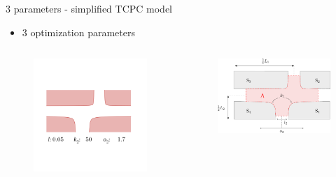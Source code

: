 \documentclass[aspectratio=169,xcolor=dvipsnames]{beamer}
\begin{document}
\begin{frame}{3 parameters - simplified TCPC model}
	\begin{itemize}
		\item 3 optimization parameters
	\end{itemize}
	\begin{columns}
		\begin{column}{.58\textwidth}
			\begin{figure}
				\includegraphics[width=1.\linewidth, trim={5cm 6cm 8cm 19cm}, clip]{Images/d.png}		
			\end{figure}
		\end{column}
		\begin{column}{.42\textwidth}
			\vspace{-15mm}
			\begin{figure}
				\includegraphics[width=1.\linewidth, trim={0 0 0 0}, clip]{Images/krizovatka.pdf}		

\end{figure}
\end{column}
\end{columns}
\end{frame}
\end{document}

